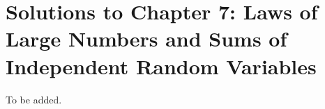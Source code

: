 \section{Solutions to Chapter 7: Laws of Large Numbers and Sums of Independent Random Variables}
\label{sec:solutions-chapter-7}

\setcounter{Lcount}{0}
\begin{list}{7.7.}{}
\item To be added.
\end{list}

\clearpage{}

